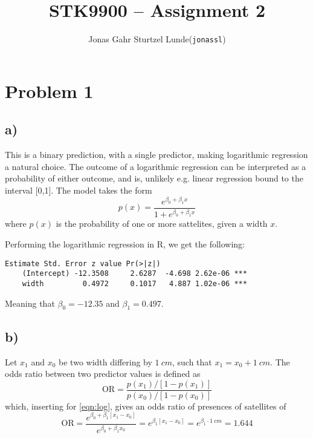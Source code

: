 \documentclass[a4paper, twocolumn]{article}
\renewcommand{\exp}{e^}
\begin{document}
\title{STK9900 -- Assignment 2}
\author{
    \begin{tabular}{r l}
        Jonas Gahr Sturtzel Lunde & (\texttt{jonassl})
    \end{tabular}}
\maketitle

\section*{Problem 1}
\subsection*{a)}
This is a binary prediction, with a single predictor, making logarithmic regression a natural choice. The outcome of a logarithmic regression can be interpreted as a probability of either outcome, and is, unlikely e.g. linear regression bound to the interval [0,1]. The model takes the form
\begin{equation}\label{eqn:log}
    p(x) = \frac{\exp{\beta_0 + \beta_1x}}{1 + \exp{\beta_0 + \beta_1x}}
\end{equation}
where $p(x)$ is the probability of one or more sattelites, given a width $x$.

Performing the logarithmic regression in R, we get the following:
\begin{Verbatim}[fontsize=\scriptsize]
                Estimate Std. Error z value Pr(>|z|)    
    (Intercept) -12.3508     2.6287  -4.698 2.62e-06 ***
    width         0.4972     0.1017   4.887 1.02e-06 ***
\end{Verbatim}

Meaning that $\beta_0 = -12.35$ and $\beta_1 = 0.497$.

\subsection*{b)}
Let $x_1$ and $x_0$ be two width differing by $\SI{1}{cm}$, such that $x_1 = x_0 + \SI{1}{cm}$. The odds ratio between two predictor values is defined as
\begin{equation}
    \mathrm{OR} = \frac{p(x_1)/[1-p(x_1)]}{p(x_0)/[1 - p(x_0)]}
\end{equation}
which, inserting for \ref{eqn:log}, gives an odds ratio of presences of satellites of
\begin{equation}
    \mathrm{OR} = \frac{\exp{\beta_0 + \beta_1[x_1 - x_0]}}{\exp{\beta_0 + \beta_1 x_0}} = \exp{\beta_1[x_1 - x_0]} = \exp{\beta_1 \cdot \SI{1}{cm}} = 1.644
\end{equation}
\end{document}
